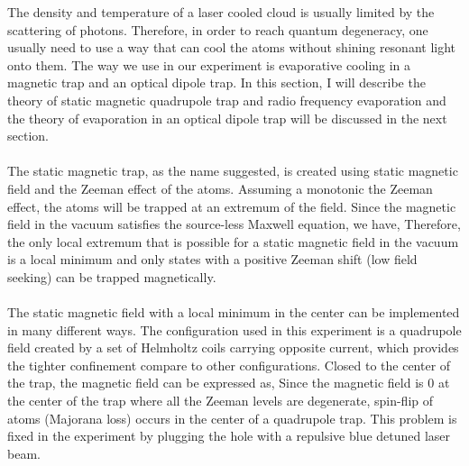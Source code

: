 The density and temperature of a laser cooled cloud is usually limited by the scattering of photons. Therefore, in order to reach quantum degeneracy, one usually need to use a way that can cool the atoms without shining resonant light onto them. The way we use in our experiment is evaporative cooling in a magnetic trap and an optical dipole trap. In this section, I will describe the theory of static magnetic quadrupole trap and radio frequency evaporation and the theory of evaporation in an optical dipole trap will be discussed in the next section.\\
\\
The static magnetic trap, as the name suggested, is created using static magnetic field and the Zeeman effect of the atoms. Assuming a monotonic the Zeeman effect, the atoms will be trapped at an extremum of the field. Since the magnetic field in the vacuum satisfies the source-less Maxwell equation, we have,
Therefore, the only local extremum that is possible for a static magnetic field in the vacuum is a local minimum and only states with a positive Zeeman shift (low field seeking) can be trapped magnetically.\\
\\
The static magnetic field with a local minimum in the center can be implemented in many different ways. The configuration used in this experiment is a quadrupole field created by a set of Helmholtz coils carrying opposite current, which provides the tighter confinement compare to other configurations. Closed to the center of the trap, the magnetic field can be expressed as,
Since the magnetic field is $0$ at the center of the trap where all the Zeeman levels are degenerate, spin-flip of atoms (Majorana loss) occurs in the center of a quadrupole trap. This problem is fixed in the experiment by plugging the hole with a repulsive blue detuned laser beam.\\
